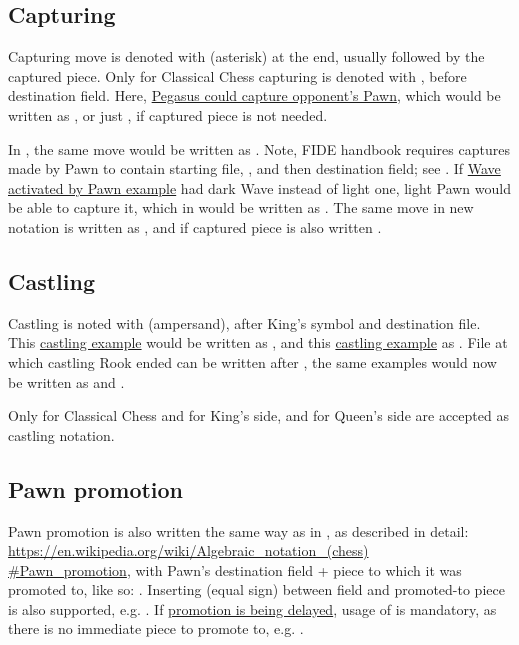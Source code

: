 \subsection*{Capturing}
\label{sec:Appendix/Notation/Capturing}

Capturing move is denoted with \alg{*} (asterisk) at the end, usually followed by the captured
piece. Only for Classical Chess capturing is denoted with , before destination field.
Here, \hyperref[fig:scn_ct_04_pegasus_movement]{Pegasus could capture opponent's Pawn}, which
would be written as , or just , if captured piece is not needed.

In , the same move would be written as . Note, FIDE handbook requires
captures made by Pawn to contain starting file, , and then destination field; see
.
If \hyperref[fig:scn_mv_18_wave_activation_by_capture_pawn]{Wave activated by Pawn example} had
dark Wave instead of light one, light Pawn would be able to capture it, which in 
would be written as . The same move in new notation is written as , and
if captured piece is also written .

\subsection*{Castling}
\label{sec:Appendix/Notation/Castling}

Castling is noted with \alg{\&} (ampersand), after King's symbol and destination file. This
\hyperref[fig:age_of_aquarius_castling_left_04]{castling example} would be written as ,
and this \hyperref[fig:one_castling_right_04]{castling example} as . File at which
castling Rook ended can be written after \alg{\&}, the same examples would now be written as
 and .

Only for Classical Chess  and  for King's side,  and
 for Queen's side are accepted as castling notation.

\subsection*{Pawn promotion}
\label{sec:Appendix/Notation/Pawn promotion}

Pawn promotion is also written the same way as in , as described in detail: \\
\href{https://en.wikipedia.org/wiki/Algebraic\_notation\_(chess)\#Pawn\_promotion}{https://en.wikipedia.org/wiki/Algebraic\_notation\_(chess)\\
\#Pawn\_promotion}, with Pawn's destination field + piece to which it was promoted to,
like so: . Inserting \alg{=} (equal sign) between field and promoted-to piece
is also supported, e.g. .
If \hyperref[fig:scn_aoa_05_delayed_promo_pawn_2_moved]{promotion is being delayed}, usage
of \alg{=} is mandatory, as there is no immediate piece to promote to, e.g. .

